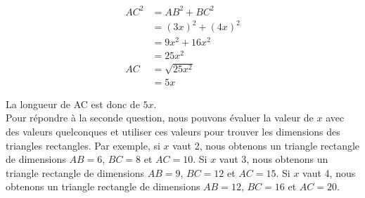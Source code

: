 \documentclass[../Cours.tex]{subfiles}
\begin{document}
\begin{questions}
\begin{align*}
AC^2 &= AB^2 + BC^2 \\
&= (3x)^2 + (4x)^2 \\
&= 9x^2 + 16x^2 \\
&= 25x^2 \\
AC &= \sqrt{25x^2}\\
&= 5x
\end{align*}

La longueur de AC est donc de $5x$.\\

Pour répondre à la seconde question, nous pouvons évaluer la valeur de $x$ avec des valeurs quelconques et utiliser ces valeurs pour trouver les dimensions des triangles rectangles. Par exemple, si $x$ vaut 2, nous obtenons un triangle rectangle de dimensions $AB = 6$, $BC = 8$ et $AC = 10$. Si $x$ vaut 3, nous obtenons un triangle rectangle de dimensions $AB = 9$, $BC = 12$ et $AC = 15$. Si $x$ vaut 4, nous obtenons un triangle rectangle de dimensions $AB = 12$, $BC = 16$ et $AC = 20$.

\end{questions}
\end{document}
